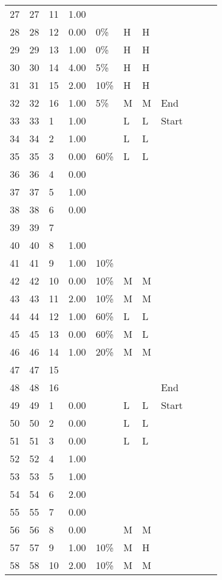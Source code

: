 \begin{longtable}{lllllllllll}
  27 &  27 &  11 & 1.00 &  &  &  &  \\ 
  28 &  28 &  12 & 0.00 & 0\% & H & H &  \\ 
  29 &  29 &  13 & 1.00 & 0\% & H & H &  \\ 
  30 &  30 &  14 & 4.00 & 5\% & H & H &  \\ 
  31 &  31 &  15 & 2.00 & 10\% & H & H &  \\ 
  32 &  32 &  16 & 1.00 & 5\% & M & M & End \\ 
  33 &  33 &   1 & 1.00 &  & L & L & Start \\ 
  34 &  34 &   2 & 1.00 &  & L & L &  \\ 
  35 &  35 &   3 & 0.00 & 60\% & L & L &  \\ 
  36 &  36 &   4 & 0.00 &  &  &  &  \\ 
  37 &  37 &   5 & 1.00 &  &  &  &  \\ 
  38 &  38 &   6 & 0.00 &  &  &  &  \\ 
  39 &  39 &   7 &  &  &  &  &  \\ 
  40 &  40 &   8 & 1.00 &  &  &  &  \\ 
  41 &  41 &   9 & 1.00 & 10\% &  &  &  \\ 
  42 &  42 &  10 & 0.00 & 10\% & M & M &  \\ 
  43 &  43 &  11 & 2.00 & 10\% & M & M &  \\ 
  44 &  44 &  12 & 1.00 & 60\% & L & L &  \\ 
  45 &  45 &  13 & 0.00 & 60\% & M & L &  \\ 
  46 &  46 &  14 & 1.00 & 20\% & M & M &  \\ 
  47 &  47 &  15 &  &  &  &  &  \\ 
  48 &  48 &  16 &  &  &  &  & End \\ 
  49 &  49 &   1 & 0.00 &  & L & L & Start \\ 
  50 &  50 &   2 & 0.00 &  & L & L &  \\ 
  51 &  51 &   3 & 0.00 &  & L & L &  \\ 
  52 &  52 &   4 & 1.00 &  &  &  &  \\ 
  53 &  53 &   5 & 1.00 &  &  &  &  \\ 
  54 &  54 &   6 & 2.00 &  &  &  &  \\ 
  55 &  55 &   7 & 0.00 &  &  &  &  \\ 
  56 &  56 &   8 & 0.00 &  & M & M &  \\ 
  57 &  57 &   9 & 1.00 & 10\% & M & H &  \\ 
  58 &  58 &  10 & 2.00 & 10\% & M & M &  \\ 

\end{longtable}
